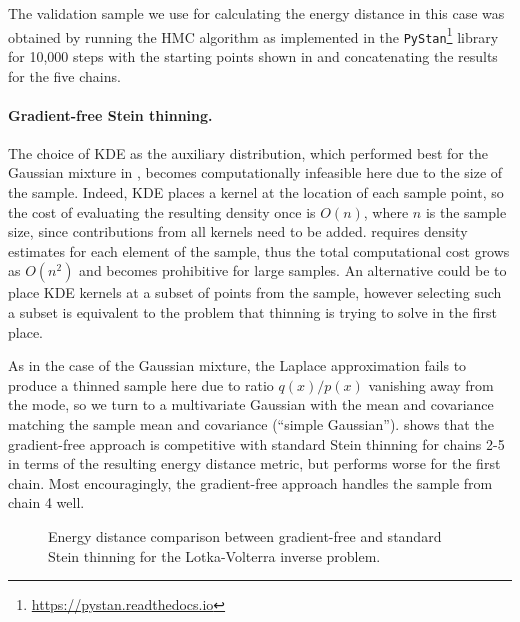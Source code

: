 \documentclass[11pt,a4paper]{report}
\begin{document}
The validation sample we use for calculating the energy distance in this case was obtained by running the HMC algorithm as implemented in the \texttt{PyStan}\footnote{\url{https://pystan.readthedocs.io}} library for 10,000 steps with the starting points shown in  and concatenating the results for the five chains.

\paragraph{Gradient-free Stein thinning.} The choice of KDE as the auxiliary distribution, which performed best for the Gaussian mixture in , becomes computationally infeasible here due to the size of the sample. Indeed, KDE places a kernel at the location of each sample point, so the cost of evaluating the resulting density once is $O(n)$, where $n$ is the sample size, since contributions from all kernels need to be added.  requires density estimates for each element of the sample, thus the total computational cost grows as $O(n^2)$ and becomes prohibitive for large samples. An alternative could be to place KDE kernels at a subset of points from the sample, however selecting such a subset is equivalent to the problem that thinning is trying to solve in the first place.

As in the case of the Gaussian mixture, the Laplace approximation fails to produce a thinned sample here due to ratio $q(x) / p(x)$ vanishing away from the mode, so we turn to a multivariate Gaussian with the mean and covariance matching the sample mean and covariance (``simple Gaussian'').  shows that the gradient-free approach is competitive with standard Stein thinning for chains 2-5 in terms of the resulting energy distance metric, but performs worse for the first chain. Most encouragingly, the gradient-free approach handles the sample from chain 4 well.

\begin{figure}[h]
\centering
{}
\caption{Energy distance comparison between gradient-free and standard Stein thinning for the Lotka-Volterra inverse problem.
\label{fig:lotka-volterra:gf-thinning:energy-distance}}
\end{figure}
\end{document}
